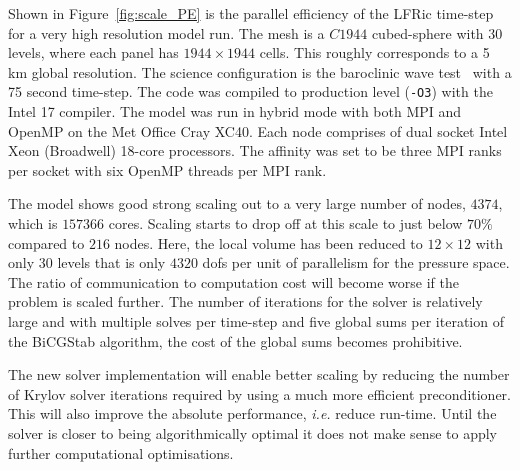 \documentclass[review,times]{elsarticle}
\begin{document}
Shown in Figure~\ref{fig:scale_PE} is 
the parallel efficiency of the LFRic time-step for a very high 
resolution model run. The mesh is a $C1944$ cubed-sphere with 30 
levels, where each panel has $1944 \times 1944$ cells. This roughly corresponds 
to a 5 km global resolution. The science configuration is the baroclinic wave 
test~\cite{qj.2241} with a 75 second time-step. The code was compiled 
to production level (\verb+-O3+) with the Intel 17 compiler. The model 
was run in hybrid mode with both MPI and OpenMP on the Met Office Cray 
XC40. Each node comprises of dual socket Intel Xeon (Broadwell) 
18-core processors. The affinity was set to be three MPI ranks per 
socket with six OpenMP threads per MPI rank. 

The model shows good strong scaling out to a very large number of nodes,
$4374$, which is $157366$ cores. Scaling starts to drop off at this
scale to just below $70\%$ compared to $216$ nodes. Here, the local
volume has been reduced to $12\times 12$ with only $30$ levels that is
only $4320$ dofs per unit of parallelism for the pressure space. The
ratio of communication to computation cost will become worse if the
problem is scaled further. The number of iterations for the
solver is relatively large and with multiple solves per time-step and
five global sums per iteration of the BiCGStab algorithm, the
cost of the global sums becomes prohibitive.

The new solver implementation will enable better scaling by reducing
the number of Krylov solver iterations required by using a much more
efficient preconditioner. This will also improve the absolute
performance, {\em i.e.} reduce run-time. Until the solver is closer to
being algorithmically optimal it does not make sense to apply further
computational optimisations.
\end{document}
